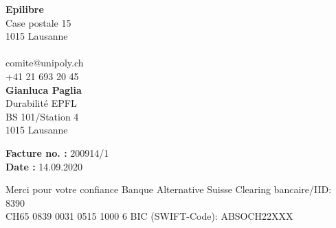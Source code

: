 \documentclass{invoice} %
\newcommand\tab[1][1cm]{\hspace*{#1}}
\begin{document}


{\bf Epilibre} \\
Case postale 15 \\ %
1015 Lausanne \\
\\
comite@unipoly.ch \\
+41 21 693 20 45 \\
\tab[10cm]  {\bf Gianluca Paglia}\\ %
\tab[10cm]  Durabilité EPFL\\ %
\tab[10cm] BS 101/Station 4\\ %
\tab[10cm] 1015 Lausanne

{\bf Facture no. :} \tab[0.075cm] 200914/1 \\ %
{\bf Date :} \tab[1.5cm] 14.09.2020 \\ %


\begin{invoiceTable}

\iffalse
\feetype{Accounting Services} %
\fi



\subtotal* %



\end{invoiceTable}
Merci pour votre confiance
\vfill
\hline
Banque Alternative Suisse \hfill Clearing bancaire/IID: 8390 \\
CH65 0839 0031 0515 1000 6 \hfill BIC (SWIFT-Code): ABSOCH22XXX \\

\end{document}
